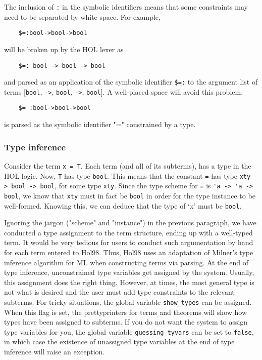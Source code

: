 \documentclass[12pt,fleqn,layout,a4paper]{report}
\begin{document}
The inclusion of \verb+:+ in the symbolic identifiers means that some
constraints may need to be separated by white space. For example,
\begin{verbatim}
    $=:bool->bool->bool
\end{verbatim}
will be broken up by the HOL lexer as
\begin{verbatim}
    $=: bool -> bool -> bool
\end{verbatim}
and parsed as an application of the symbolic identifier \verb+$=:+ to
the argument list of terms [\verb+bool+, \verb+->+, \verb+bool+,
\verb+->+, \verb+bool+]. A well-placed space will avoid this problem:
\begin{verbatim}
    $= :bool->bool->bool
\end{verbatim}
is parsed as the symbolic identifier "=" constrained by a type.

 \subsubsection{Type inference}

Consider the term \verb+x = T+.
Each term (and all of its subterms), has a type in the HOL
logic. Now, \verb+T+ has type \verb+bool+. This means that the constant
\verb+=+ has type \verb+xty -> bool -> bool+, for some type
\verb+xty+. Since the type scheme for \verb+=+ is
\verb+'a -> 'a -> bool+, we know that \verb+xty+ must in fact be
\verb+bool+ in order for the type instance to be well-formed. Knowing
this, we can deduce that the type of `x' must be \verb+bool+.

   Ignoring the jargon ("scheme" and "instance") in the previous
paragraph, we have conducted a type assignment to the term structure,
ending up with a well-typed term. It would be very tedious for users to
conduct such argumentation by hand for each term entered to Hol98. Thus,
Hol98 uses an adaptation of Milner's type inference algorithm for ML
when constructing terms via parsing. At the end of type inference,
unconstrained type variables get assigned by the system. Usually, this
assignment does the right thing. However, at times, the most general
type is not what is desired and the user must add type constraints to
the relevant subterms. For tricky situations, the global variable
\verb+show_types+ can be assigned. When this flag is set, the prettyprinters
for terms and theorems will show how types have been assigned to
subterms. If you do not want the system to assign type variables for
you, the global variable \verb+guessing_tyvars+ can be set to
\verb+false+, in which case the existence of unassigned type variables
at the end of type inference will raise an exception.
\end{document}
